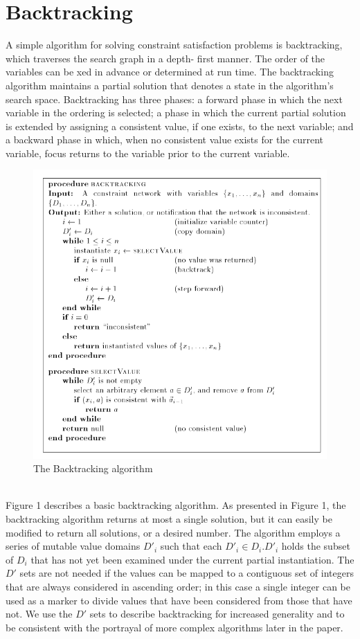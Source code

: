 \documentclass{article}
\begin{document}
\section{Backtracking}
A simple algorithm for solving constraint satisfaction problems is backtracking,
which traverses the search graph in a depth- first manner. The order of the
variables can be xed in advance or determined at run time. The backtracking
algorithm maintains a partial solution that denotes a state in the algorithm's
search space. Backtracking has three phases: a forward phase in which the next
variable in the ordering is selected; a phase in which the current partial solution
is extended by assigning a consistent value, if one exists, to the next variable;
and a backward phase in which, when no consistent value exists for the current
variable, focus returns to the variable prior to the current variable. 
\begin{figure}[h]
  \centering
  \includegraphics[scale=0.8]{Figs/backtracking-algorithm.png}
  \caption{The Backtracking algorithm}
\end{figure}
\\


Figure 1 describes a basic backtracking algorithm. As presented in Figure 1,
the backtracking algorithm returns at most a single solution, but it can easily be
modified to return all solutions, or a desired number. The algorithm employs a
series of mutable value domains \textit{$D'_i$} such that each \textit{$D'_i \in D_i. D'_i$} holds the subset of $D_i$ that has not yet been examined under the current partial instantiation.
The $D'$ sets are not needed if the values can be mapped to a contiguous set
of integers that are always considered in ascending order; in this case a single
integer can be used as a marker to divide values that have been considered from
those that have not. We use the $D'$ sets to describe backtracking for increased
generality and to be consistent with the portrayal of more complex algorithms
later in the paper. \\
\end{document}

